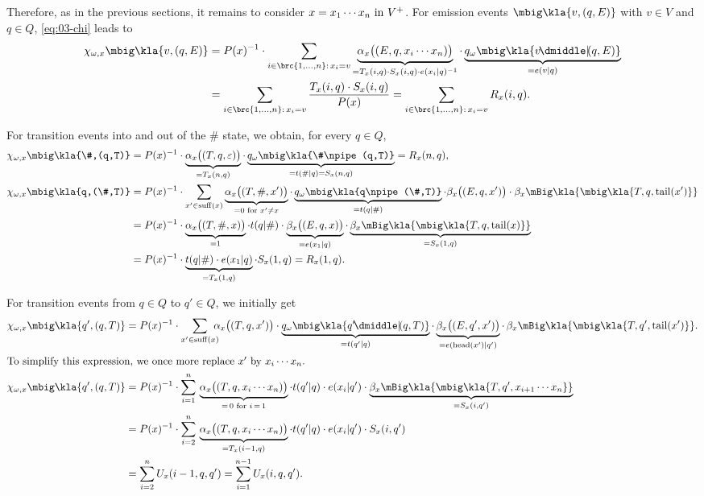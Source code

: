Therefore, as in the previous sections, it remains to consider $x=x_1\cdots
x_n\text{ in } V^+$. For emission events $\mbig\kla{v,(q,E)}$ with $v\in V$ and $q\in
Q$, \eqref{eq:03-chi} leads to
\begin{align*}
 \chi_{\omega,x}\mbig\kla{v,(q,E)}
 &= P(x)^{-1} \cdot \sum_{i\in\brc{1,\ldots,n}:\, x_i=v} \underbrace{\alpha_x\doublekla{E,q,x_i\cdots x_n}}_{=T_x(i,q)\cdot S_x(i,q)\cdot e(x_i|q)^{-1}} \cdot \underbrace{q_\omega\mbig\kla{v\npipe(q,E)}}_{=e(v|q)} \\
 &= \sum_{i\in\brc{1,\ldots,n}:\, x_i=v} \frac{T_x(i,q)\cdot S_x(i,q)}{P(x)}
  = \sum_{i\in\brc{1,\ldots,n}:\, x_i=v} R_x(i,q).
\end{align*}

For transition events into and out of the $\#$ state, we obtain, for every $q\in Q$,
\begin{align*}
 \chi_{\omega,x}\mbig\kla{\#,(q,T)}
 &= P(x)^{-1} \cdot \underbrace{\alpha_x\doublekla{T,q,\eps}}_{=T_x(n,q)} \cdot \underbrace{q_\omega\mbig\kla{\#\npipe(q,T)}}_{=t(\#|q)=S_x(n,q)} = R_x(n,q), \\
 \chi_{\omega,x}\mbig\kla{q,(\#,T)}
 &= P(x)^{-1} \cdot \sum_{x'\in\suff(x)} \underbrace{\alpha_x\doublekla{T,\#,x'}}_{=0\text{ for }x'\neq x} \cdot \underbrace{q_\omega\mbig\kla{q\npipe(\#,T)}}_{=t(q|\#)} \cdot \beta_x\doublekla{E,q,x'} \cdot \beta_x\mBig\kla{\mbig\kla{T,q,\cdr(x')}} \\
 &= P(x)^{-1} \cdot \underbrace{\alpha_x\doublekla{T,\#,x}}_{=1} \cdot t(q|\#) \cdot \underbrace{\beta_x\doublekla{E,q,x}}_{=e(x_1|q)} \cdot \underbrace{\beta_x\mBig\kla{\mbig\kla{T,q,\cdr(x)}}}_{=S_x(1,q)} \\
 &= P(x)^{-1} \cdot \underbrace{t(q|\#) \cdot e(x_1|q)}_{=T_x(1,q)} \cdot S_x(1,q)
  = R_x(1,q).
\end{align*}

For transition events from $q\in Q$ to $q'\in Q$, we initially get
\begin{align*}
 \chi_{\omega,x}\mbig\kla{q',(q,T)}
 &= P(x)^{-1} \cdot \sum_{x'\in\suff(x)} \!\!\!\!\alpha_x\doublekla{T,q,x'} \cdot \underbrace{q_\omega\mbig\kla{q'\npipe(q,T)}}_{=t(q'|q)} \cdot \underbrace{\beta_x\doublekla{E,q',x'}}_{=e(\car(x')|q')} \cdot\, \beta_x\mBig\kla{\mbig\kla{T,q',\cdr(x')}}. \\
 \intertext{To simplify this expression, we once more replace $x'$ by $x_i\cdots x_n$.}
 \chi_{\omega,x}\mbig\kla{q',(q,T)}
 &= P(x)^{-1} \cdot \sum_{i=1}^n \,\underbrace{\alpha_x\doublekla{T,q,x_i\cdots x_n}}_{=\,0\text{ for }i\,=\,1} \cdot t(q'|q) \cdot e(x_i|q') \cdot \underbrace{\beta_x\mBig\kla{\mbig\kla{T,q',x_{i+1}\cdots x_n}}}_{=S_x(i,q')} \\
 &= P(x)^{-1} \cdot \sum_{i=2}^n \,\underbrace{\alpha_x\doublekla{T,q,x_i\cdots x_n}}_{=T_x(i-1,q)} \cdot t(q'|q) \cdot e(x_i|q') \cdot S_x(i,q') \\
 &= \sum_{i=2}^n U_x(i-1,q,q') = \sum_{i=1}^{n-1} U_x(i,q,q').
\end{align*}

